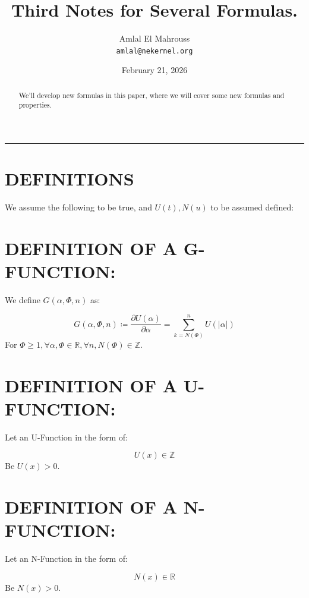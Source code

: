 \documentclass[11pt, a4paper]{article}
\title{Third Notes for Several Formulas.}
\author{Amlal El Mahrouss\\\texttt{amlal@nekernel.org}}
\date{February 21, 2026}
\begin{document}
\maketitle

\begin{center}
	\rule[0.01cm]{17cm}{0.01cm}
\end{center}

\begin{abstract}
\begin{center}
    We'll develop new formulas in this paper, where we will cover some new formulas and properties.
\end{center}
\end{abstract}

\section{DEFINITIONS}

We assume the following to be true, and $U(t), N(u)$ to be assumed defined:

\section{DEFINITION OF A G-FUNCTION:}

We define $G(\alpha, \Phi, n)$ as:

\begin{equation}
    G(\alpha, \Phi, n) \coloneqq \frac{\partial U(\alpha)}{\partial \alpha} = \sum_{k=N(\Phi)}^{n} U(|\alpha|)
\end{equation}
For $\Phi \geq 1, \forall \alpha, \Phi \in \mathbb{R}, \forall n, N(\Phi) \in \mathbb{Z}$.

\section{DEFINITION OF A U-FUNCTION:}

Let an U-Function in the form of:

\begin{equation}
    U(x) \in \mathbb{Z}
\end{equation}
Be $U(x) > 0$.

\section{DEFINITION OF A N-FUNCTION:}

Let an N-Function in the form of:

\begin{equation}
    N(x) \in \mathbb{R}
\end{equation}
Be $N(x) > 0$.
\end{document}
